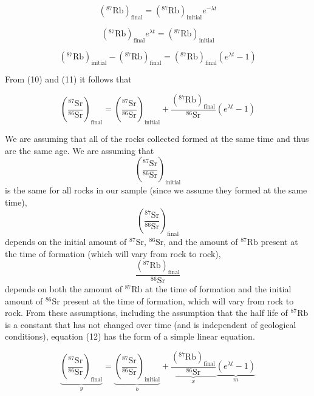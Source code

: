 \documentclass[11pt]{article}
\begin{document}
\[
\left(^{87}\mathrm{Rb}\right)_{\mathrm{final}}
=
\left(^{87}\mathrm{Rb}\right)_{\mathrm{initial}}e^{-\lambda t}
\]

\[
\left(^{87}\mathrm{Rb}\right)_{\mathrm{final}}e^{\lambda t}
=
\left(^{87}\mathrm{Rb}\right)_{\mathrm{initial}}
\]

\begin{equation}
\left(^{87}\mathrm{Rb}\right)_{\mathrm{initial}}
-
\left(^{87}\mathrm{Rb}\right)_{\mathrm{final}}
=
\left(^{87}\mathrm{Rb}\right)_{\mathrm{final}}\left(e^{\lambda t}-1\right)
\end{equation}

From (10) and (11) it follows that

\begin{equation}
\left(\frac{^{87}\mathrm{Sr}}{^{86}\mathrm{Sr}}\right)_{\mathrm{final}}
=
\left(\frac{^{87}\mathrm{Sr}}{^{86}\mathrm{Sr}}\right)_{\mathrm{initial}}
+
\frac{\left(^{87}\mathrm{Rb}\right)_{\mathrm{final}}}{^{86}\mathrm{Sr}}
\left(e^{\lambda t}-1\right)
\end{equation}

We are assuming that all of the rocks collected formed at the same time and thus are the same age. We are assuming that
\[
\left(\frac{^{87}\mathrm{Sr}}{^{86}\mathrm{Sr}}\right)_{\mathrm{initial}}
\]
is the same for all rocks in our sample (since we assume they formed at the same time),
\[
\left(\frac{^{87}\mathrm{Sr}}{^{86}\mathrm{Sr}}\right)_{\mathrm{final}}
\]
depends on the initial amount of $^{87}\mathrm{Sr}$, $^{86}\mathrm{Sr}$, and the amount of $^{87}\mathrm{Rb}$ present at the time of formation (which will vary from rock to rock),
\[
\frac{\left(^{87}\mathrm{Rb}\right)_{\mathrm{final}}}{^{86}\mathrm{Sr}}
\]
depends on both the amount of $^{87}\mathrm{Rb}$ at the time of formation and the initial amount of $^{86}\mathrm{Sr}$ present at the time of formation, which will vary from rock to rock. From these assumptions, including the assumption that the half life of $^{87}\mathrm{Rb}$ is a constant that has not changed over time (and is independent of geological conditions), equation (12) has the form of a simple linear equation.

\begin{equation}
\underbrace{\left(\frac{^{87}\mathrm{Sr}}{^{86}\mathrm{Sr}}\right)_{\mathrm{final}}}_{y}
=
\underbrace{\left(\frac{^{87}\mathrm{Sr}}{^{86}\mathrm{Sr}}\right)_{\mathrm{initial}}}_{b}
+
\underbrace{\frac{\left(^{87}\mathrm{Rb}\right)_{\mathrm{final}}}{^{86}\mathrm{Sr}}}_{x}
\underbrace{\left(e^{\lambda t}-1\right)}_{m}
\end{equation}
\end{document}
